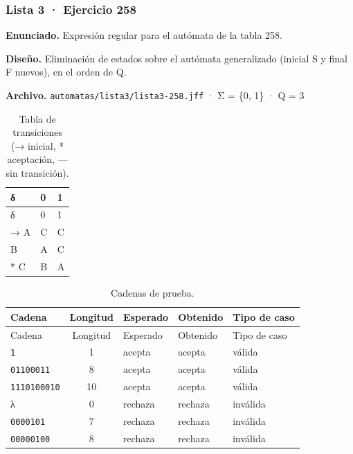 
\hypertarget{lista-3-ejercicio-258}{%
\subsubsection{Lista 3 · Ejercicio 258}\label{lista-3-ejercicio-258}}

\textbf{Enunciado.} Expresión regular para el autómata de la tabla 258.

\textbf{Diseño.} Eliminación de estados sobre el autómata generalizado (inicial S y final F nuevos), en el orden de Q.

\textbf{Archivo.} \texttt{automatas/lista3/lista3-258.jff} · Σ = \{0, 1\} · \textbar Q\textbar{} = 3

\begin{longtable}[]{@{}lll@{}}
\caption{Tabla de transiciones (→ inicial, * aceptación, --- sin transición).}\tabularnewline
\toprule\noalign{}
δ & 0 & 1 \\
\midrule\noalign{}
\endfirsthead
\toprule\noalign{}
δ & 0 & 1 \\
\midrule\noalign{}
\endhead
\bottomrule\noalign{}
\endlastfoot
→ A & C & C \\
B & A & C \\
* C & B & A \\
\end{longtable}

\begin{longtable}[]{@{}lclll@{}}
\caption{Cadenas de prueba.}\tabularnewline
\toprule\noalign{}
Cadena & Longitud & Esperado & Obtenido & Tipo de caso \\
\midrule\noalign{}
\endfirsthead
\toprule\noalign{}
Cadena & Longitud & Esperado & Obtenido & Tipo de caso \\
\midrule\noalign{}
\endhead
\bottomrule\noalign{}
\endlastfoot
\texttt{1} & 1 & acepta & acepta & válida \\
\texttt{01100011} & 8 & acepta & acepta & válida \\
\texttt{1110100010} & 10 & acepta & acepta & válida \\
λ & 0 & rechaza & rechaza & inválida \\
\texttt{0000101} & 7 & rechaza & rechaza & inválida \\
\texttt{00000100} & 8 & rechaza & rechaza & inválida \\
\end{longtable}


